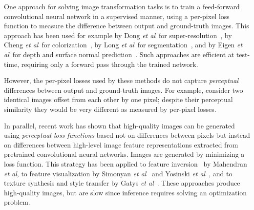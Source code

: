 \documentclass[runningheads]{llncs}
\newcommand{\etal}{\textit{et al}}
\begin{document}
One approach for solving image transformation tasks is to train a feed-forward convolutional
neural network in a supervised manner, using a per-pixel loss function to measure the difference
between output and ground-truth images. This approach has been used for example by Dong \etal~for
super-resolution~\cite{dong2015image}, by Cheng \etal~for colorization~\cite{cheng2015deep}, by
Long \etal~for segmentation~\cite{long_shelhamer_fcn}, and by Eigen \etal~for depth and
surface normal prediction~\cite{eigen2014depth,eigen2015predicting}. Such approaches are
efficient at test-time, requiring only a forward pass through the trained network.

However, the per-pixel losses used by these methods do not capture
\emph{perceptual} differences between output and ground-truth images. For example, consider
two identical images offset from each other by one pixel; despite their perceptual similarity
they would be very different as measured by per-pixel losses.

In parallel, recent work has shown that high-quality images can be generated using
\emph{perceptual loss functions} based not on differences between pixels but instead on
differences between high-level image feature representations extracted from pretrained
convolutional neural networks. Images are generated by minimizing a loss function.
This strategy has been applied to feature inversion~\cite{mahendran15understanding}
by Mahendran \etal, to feature visualization by Simonyan \etal~\cite{simonyan2013deep}
and Yosinski \etal~\cite{yosinski2015understanding}, and to texture synthesis and style
transfer by Gatys \etal~\cite{Gatys2015b,gatys2015neural}.  These approaches produce
high-quality images, but are slow since inference requires solving an optimization problem.
\end{document}
